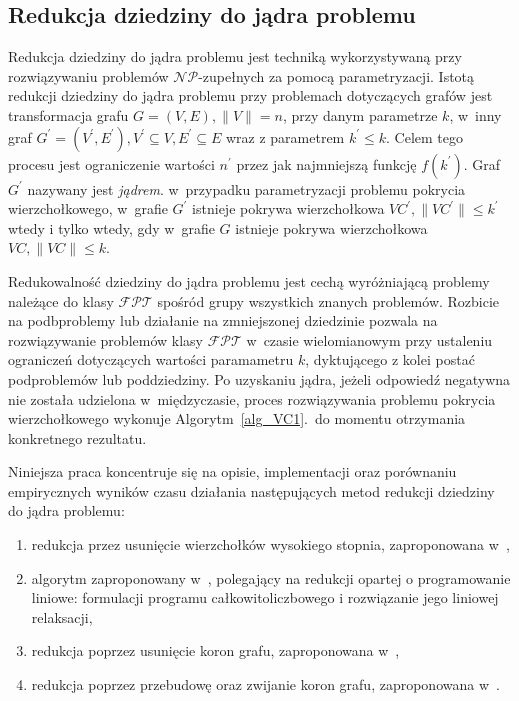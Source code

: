 \subsection{Redukcja dziedziny do jądra problemu}\label{subsection_kernelization}
\par{
  Redukcja dziedziny do jądra problemu jest techniką wykorzystywaną przy
  rozwiązywaniu problemów $\mathcal{NP}$-zupełnych za pomocą parametryzacji.
  Istotą redukcji dziedziny do jądra problemu przy problemach dotyczących grafów
  jest transformacja grafu $G=(V,E), \|V\|=n$, przy danym parametrze $k$, w~inny
  graf $G^{\prime}=(V^{\prime}, E^{\prime}), V^{\prime} \subseteq V, E^{\prime} \subseteq E$
  wraz z parametrem $k^{\prime} \leq k$.
  Celem tego procesu jest ograniczenie wartości $n^{\prime}$ przez jak najmniejszą
  funkcję $f(k^{\prime})$.
  Graf $G^{\prime}$ nazywany jest \emph{jądrem}.
  w~przypadku parametryzacji problemu pokrycia wierzchołkowego, w~grafie
  $G^{\prime}$ istnieje pokrywa wierzchołkowa $VC^{\prime}, \|VC^{\prime}\|\leq k^{\prime}$ 
  wtedy i tylko wtedy, gdy w~grafie $G$ istnieje pokrywa wierzchołkowa $VC,
  \|VC\| \leq k$.
}
\par{
  Redukowalność dziedziny do jądra problemu jest cechą wyróżniającą problemy 
  należące do klasy $\mathcal{FPT}$ spośród grupy wszystkich znanych problemów.
  Rozbicie na podbproblemy lub działanie na zmniejszonej dziedzinie pozwala na
  rozwiązywanie problemów klasy $\mathcal{FPT}$ w~czasie wielomianowym przy
  ustaleniu ograniczeń dotyczących wartości paramametru $k$, dyktującego z kolei
  postać podproblemów lub poddziedziny.
  Po uzyskaniu jądra, jeżeli odpowiedź negatywna nie została udzielona
  w~międzyczasie, proces rozwiązywania problemu pokrycia wierzchołkowego
  wykonuje Algorytm~\ref{alg_VC1}.\ do momentu otrzymania konkretnego
  rezultatu.
}
\par{
  Niniejsza praca koncentruje się na opisie, implementacji oraz porównaniu
  empirycznych wyników czasu działania następujących metod redukcji dziedziny do
  jądra problemu:
  \begin{enumerate}
    \item redukcja przez usunięcie wierzchołków wysokiego stopnia, zaproponowana
      w~\cite{KernelizationAlgorithms04},
    \item algorytm zaproponowany w~\cite{KernelizationAlgorithms04}, polegający
      na redukcji opartej o programowanie liniowe: formulacji programu
      całkowitoliczbowego i rozwiązanie jego liniowej relaksacji,
    \item redukcja poprzez usunięcie koron grafu, zaproponowana
      w~\cite{abukhzam03},
    \item redukcja poprzez przebudowę oraz zwijanie koron grafu, zaproponowana
      w~\cite{ImprovedBounds10}.
  \end{enumerate}
}
